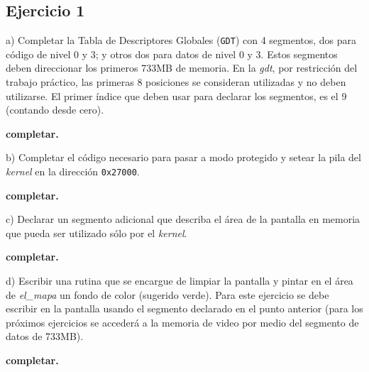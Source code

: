 \subsection*{Ejercicio 1}
\vspace*{0.5cm} 

\noindent
a) Completar la Tabla de Descriptores Globales (\verb|GDT|) con 4 segmentos, dos para código de
nivel 0 y 3; y otros dos para datos de nivel 0 y 3. Estos segmentos deben direccionar los
primeros 733MB de memoria. En la \textit{gdt}, por restricción del trabajo práctico, las primeras 
8 posiciones se consideran utilizadas y no deben utilizarse. El primer índice que deben usar
para declarar los segmentos, es el 9 (contando desde cero).

\vspace*{0.3cm}

\textbf{completar.}

\vspace*{0.5cm} \noindent



\noindent
b) Completar el código necesario para pasar a modo protegido y setear la pila del \textit{kernel}
en la dirección \verb|0x27000|.

\vspace*{0.3cm}

\textbf{completar.}

\vspace*{0.5cm} \noindent



\noindent
c) Declarar un segmento adicional que describa el área de la pantalla en memoria que pueda ser 
utilizado sólo por el \textit{kernel}.

\vspace*{0.3cm}

\textbf{completar.}

\vspace*{0.5cm} \noindent



\noindent
d) Escribir una rutina que se encargue de limpiar la pantalla y pintar en el área de \textit{el_mapa} un 
fondo de color (sugerido verde). Para este ejercicio se debe escribir en la pantalla usando el segmento 
declarado en el punto anterior (para los próximos ejercicios se accederá a la memoria de video por medio del 
segmento de datos de 733MB).

\vspace*{0.3cm}

\textbf{completar.}

